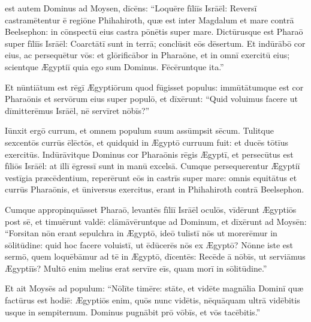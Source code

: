 

\thispagestyle{empty}

 est autem Dominus ad Moysen, dīcēns: ``Loquēre
fīliīs Isrāēl: Reversī castramētentur ē regiōne Phihahiroth, quæ est inter Magdalum et mare
contrā Beelsephon: in cōnspectū eius castra pōnētis super mare.
Dictūrusque est Pharaō super fīliīs Isrāēl:
Coarctātī sunt in terrā;
conclūsit eōs
dēsertum. Et indūrābō cor eius, ac
persequētur vōs: et glōrificābor in
Pharaōne, et in omnī exercitū eius; scientque Ægyptiī quia
ego sum Dominus. Fēcēruntque ita.''

Et nūntiātum est rēgī Ægyptiōrum quod
fūgisset populus: immūtātumque est cor\linebreak
Pharaōnis et servōrum eius super populō, et dīxērunt: ``Quid
voluimus facere ut dīmitterēmus Isrāēl, nē servīret nōbīs?''

Iūnxit ergō
currum, et omnem populum suum assūmpsit sēcum. Tulitque sexcentōs currūs
ēlēctōs, et quidquid in Ægyptō curruum fuit: et ducēs tōtīus exercitūs.
Indū\-rāvitque Dominus cor Pharaōnis rēgis Ægyptī, et persecūtus est fīliōs
Isrāēl: at illī ēgressī sunt in manū excelsā.
Cumque persequerentur Ægyptiī vestīgia præcēdentium, reperērunt eōs in castrīs super mare: omnis equitātus et
currūs Pharaōnis, et ūniversus exercitus, erant in Phihahiroth contrā
Beelsephon. 

Cumque appropinquāsset Pharaō, levantēs fīliī Isrāēl oculōs,
vīdērunt Ægyptiōs post sē, et timuērunt valdē: clāmāvēruntque ad Dominum,
et dīxērunt ad Moysēn: ``Forsitan nōn erant sepulchra in
Ægyptō, ideō tulistī nōs ut morerēmur in sōlitūdine: quid hoc facere voluistī, ut ēdūcerēs
nōs ex Ægyptō? Nōnne iste est sermō, quem loquēbāmur ad tē in Ægyptō,
dīcentēs: Recēde ā nōbīs, ut serviāmus Ægyptiīs? Multō enim melius erat
servīre eīs, quam morī in sōlitūdine.''

Et ait Moysēs ad
populum: ``Nōlīte timēre: stāte, et vidēte magnālia Dominī
quæ factūrus est hodiē: Ægyptiōs enim, quōs nunc vidētis,
nēquāquam ultrā vidēbitis usque in
sempiternum. Dominus pugnābit prō vōbīs, et
vōs tacēbitis.''

